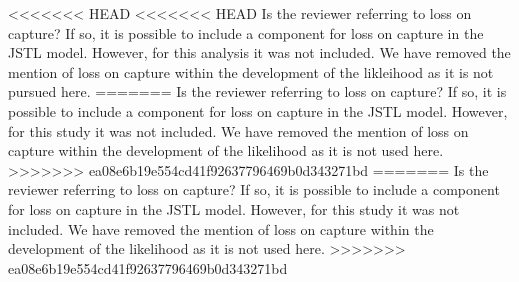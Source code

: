 \documentclass[12pt]{article}
\begin{document}
\begin{enumerate}
<<<<<<< HEAD
<<<<<<< HEAD
Is the reviewer referring to loss on capture? If so, it is possible to include a component for loss on capture in the JSTL model. However, for this analysis it was not included. We have removed the mention of loss on capture within the development of the likleihood as it is not pursued here. 
=======
Is the reviewer referring to loss on capture? If so, it is possible to include a component for loss on capture in the JSTL model. However, for this study it was not included. We have removed the mention of loss on capture within the development of the likelihood as it is not used here. 
>>>>>>> ea08e6b19e554cd41f92637796469b0d343271bd
=======
Is the reviewer referring to loss on capture? If so, it is possible to include a component for loss on capture in the JSTL model. However, for this study it was not included. We have removed the mention of loss on capture within the development of the likelihood as it is not used here. 
>>>>>>> ea08e6b19e554cd41f92637796469b0d343271bd
\end{enumerate}
\end{document}
